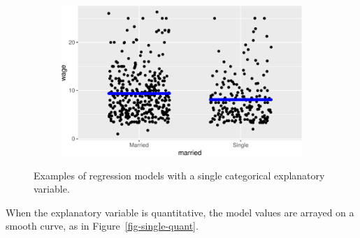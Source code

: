 \documentclass[
  letterpaper,
  DIV=11,
  numbers=noendperiod,
  oneside]{scrartcl}
\begin{document}
\begin{figure}
{\begin{figure}[H]
\begin{minipage}{0.33\linewidth}
\includegraphics{test-tufte_files/figure-pdf/unnamed-chunk-121-3.pdf}

\end{minipage}%

\end{figure}%

}

\caption{\label{fig-single-categorical}Examples of regression models
with a single categorical explanatory variable.}

\end{figure}%

When the explanatory variable is quantitative, the model values are
arrayed on a smooth curve, as in Figure~\ref{fig-single-quant}.
\end{document}
